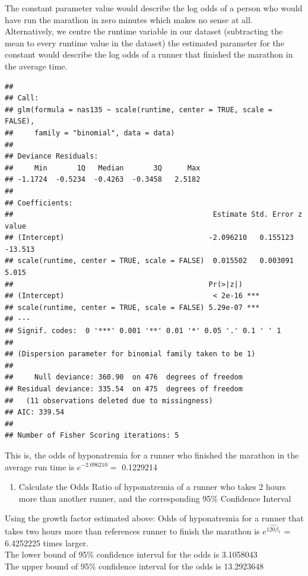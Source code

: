 \documentclass[]{article}
\begin{document}
The constant parameter value would describe the log odds of a person who
would have run the marathon in zero minutes which makes no sense at
all.\\Alternatively, we centre the runtime variable in our dataset
(subtracting the mean to every runtime value in the dataset) the
estimated parameter for the constant would describe the log odds of a
runner that finished the marathon in the average time.

\begin{verbatim}
## 
## Call:
## glm(formula = nas135 ~ scale(runtime, center = TRUE, scale = FALSE), 
##     family = "binomial", data = data)
## 
## Deviance Residuals: 
##     Min       1Q   Median       3Q      Max  
## -1.1724  -0.5234  -0.4263  -0.3458   2.5182  
## 
## Coefficients:
##                                               Estimate Std. Error z value
## (Intercept)                                  -2.096210   0.155123 -13.513
## scale(runtime, center = TRUE, scale = FALSE)  0.015502   0.003091   5.015
##                                              Pr(>|z|)    
## (Intercept)                                   < 2e-16 ***
## scale(runtime, center = TRUE, scale = FALSE) 5.29e-07 ***
## ---
## Signif. codes:  0 '***' 0.001 '**' 0.01 '*' 0.05 '.' 0.1 ' ' 1
## 
## (Dispersion parameter for binomial family taken to be 1)
## 
##     Null deviance: 360.90  on 476  degrees of freedom
## Residual deviance: 335.54  on 475  degrees of freedom
##   (11 observations deleted due to missingness)
## AIC: 339.54
## 
## Number of Fisher Scoring iterations: 5
\end{verbatim}

This is, the odds of hyponatremia for a runner who finished the marathon
in the average run time is $e^{-2.096210}=$ 0.1229214

\begin{enumerate}
\def\labelenumi{\alph{enumi}.}
\setcounter{enumi}{4}
\itemsep1pt\parskip0pt
\item
  Calculate the Odds Ratio of hyponatremia of a runner who takes 2 hours
  more than another runner, and the corresponding 95\% Confidence
  Interval
\end{enumerate}

Using the growth factor estimated above: Odds of hyponatremia for a
runner that takes two hours more than references runner to finish the
marathon is $e^{\hat{120\beta_1}}$ = 6.4252225 times larger.\\The lower
bound of 95\% confidence interval for the odds is 3.1058043\\The upper
bound of 95\% confidence interval for the odds is 13.2923648
\end{document}
